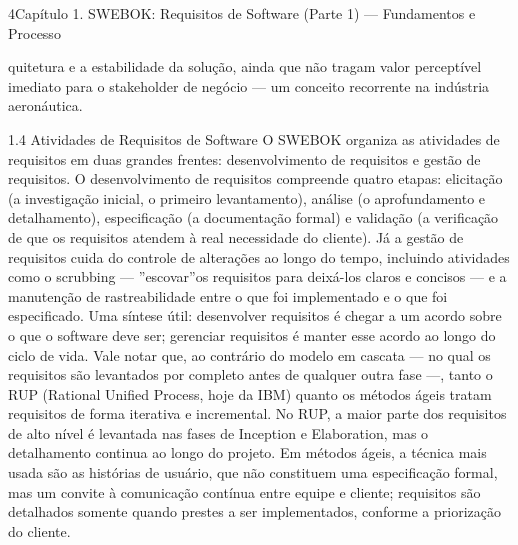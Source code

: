 4Capítulo 1. SWEBOK: Requisitos de Software (Parte 1) — Fundamentos e Processo

quitetura e a estabilidade da solução, ainda que não tragam valor perceptível imediato para o stakeholder de negócio — um conceito recorrente na indústria aeronáutica.

1.4 Atividades de Requisitos de Software O SWEBOK organiza as atividades de requisitos em duas grandes frentes: desenvolvimento de requisitos e gestão de requisitos. O desenvolvimento de requisitos compreende quatro etapas: elicitação (a investigação inicial, o primeiro levantamento), análise (o aprofundamento e detalhamento), especificação (a documentação formal) e validação (a verificação de que os requisitos atendem à real necessidade do cliente). Já a gestão de requisitos cuida do controle de alterações ao longo do tempo, incluindo atividades como o scrubbing — ”escovar”os requisitos para deixá-los claros e concisos — e a manutenção de rastreabilidade entre o que foi implementado e o que foi especificado. Uma síntese útil: desenvolver requisitos é chegar a um acordo sobre o que o software deve ser; gerenciar requisitos é manter esse acordo ao longo do ciclo de vida. Vale notar que, ao contrário do modelo em cascata — no qual os requisitos são levantados por completo antes de qualquer outra fase —, tanto o RUP (Rational Unified Process, hoje da IBM) quanto os métodos ágeis tratam requisitos de forma iterativa e incremental. No RUP, a maior parte dos requisitos de alto nível é levantada nas fases de Inception e Elaboration, mas o detalhamento continua ao longo do projeto. Em métodos ágeis, a técnica mais usada são as histórias de usuário, que não constituem uma especificação formal, mas um convite à comunicação contínua entre equipe e cliente; requisitos são detalhados somente quando prestes a ser implementados, conforme a priorização do cliente.

